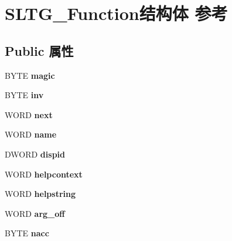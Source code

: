 \hypertarget{struct_s_l_t_g___function}{}\section{S\+L\+T\+G\+\_\+\+Function结构体 参考}
\label{struct_s_l_t_g___function}
\subsection*{Public 属性}
\begin{DoxyCompactItemize}
\item 
\mbox{\label{struct_s_l_t_g___function_a85330732b45254625b766a5a58f92c3e}} 
B\+Y\+TE {\bfseries magic}
\item 
\mbox{\label{struct_s_l_t_g___function_afb776d890ad3e4613f150fba6a693517}} 
B\+Y\+TE {\bfseries inv}
\item 
\mbox{\label{struct_s_l_t_g___function_a2a2c8c1d83aaf51d59dbcf0c40d8a2c3}} 
W\+O\+RD {\bfseries next}
\item 
\mbox{\label{struct_s_l_t_g___function_a01cc16e3eccd0eaf6e29dc114065935d}} 
W\+O\+RD {\bfseries name}
\item 
\mbox{\label{struct_s_l_t_g___function_a8504487d7e88f09ccd16afe64bfba13b}} 
D\+W\+O\+RD {\bfseries dispid}
\item 
\mbox{\label{struct_s_l_t_g___function_a454d290c7fbc99e0a3be1079ac8343f4}} 
W\+O\+RD {\bfseries helpcontext}
\item 
\mbox{\label{struct_s_l_t_g___function_a625ececa437cefc62a9789c42658cb1d}} 
W\+O\+RD {\bfseries helpstring}
\item 
\mbox{\label{struct_s_l_t_g___function_a26c2b26c545b4f6506deb3d97d71c0bf}} 
W\+O\+RD {\bfseries arg\+\_\+off}
\item 
\mbox{\label{struct_s_l_t_g___function_a1f7869aaec0b8ebc33a2781fba7d48c4}} 
B\+Y\+TE {\bfseries nacc}

\end{DoxyCompactItemize}
